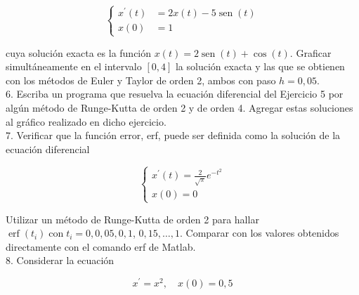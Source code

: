 \documentclass[10pt]{article}
\begin{document}
$$
\left\{\begin{aligned}
x^{\prime}(t) & =2 x(t)-5 \operatorname{sen}(t) \\
x(0) & =1
\end{aligned}\right.
$$

cuya solución exacta es la función $x(t)=2 \operatorname{sen}(t)+\cos (t)$. Graficar simultáneamente en el intervalo $[0,4]$ la solución exacta y las que se obtienen con los métodos de Euler y Taylor de orden 2, ambos con paso $h=0,05$.\\
6. Escriba un programa que resuelva la ecuación diferencial del Ejercicio 5 por algún método de Runge-Kutta de orden 2 y de orden 4. Agregar estas soluciones al gráfico realizado en dicho ejercicio.\\
7. Verificar que la función error, erf, puede ser definida como la solución de la ecuación diferencial

$$
\left\{\begin{array}{r}
x^{\prime}(t)=\frac{2}{\sqrt{\pi}} e^{-t^{2}} \\
x(0)=0
\end{array}\right.
$$

Utilizar un método de Runge-Kutta de orden 2 para hallar $\operatorname{erf}\left(t_{i}\right) \operatorname{con} t_{i}=0,0,05,0,1$, $0,15, \ldots, 1$. Comparar con los valores obtenidos directamente con el comando erf de Matlab.\\
8. Considerar la ecuación

$$
x^{\prime}=x^{2}, \quad x(0)=0,5
$$
\end{document}
